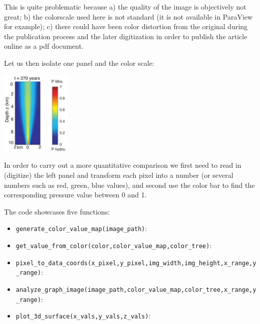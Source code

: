 This is quite problematic because a) the quality of the image is objectively not great; 
b) the colorscale used here is not standard (it is not available in ParaView for example); 
c) there could have been color distortion from the original during the publication 
process and the later digitization in order to publish the article online as a pdf document.

Let us then isolate one panel and the color scale:

\begin{center}
\includegraphics[height=4cm]{python_codes/fieldstone_170/images/graph_3_full}
\includegraphics[height=4cm]{python_codes/fieldstone_170/images/legenda}
\end{center}

In order to carry out a more quantitative comparison
we first need to read in (digitize) the left panel and transform each pixel into 
a number (or several numbers such as red, green, blue values), and second use the 
color bar to find the corresponding pressure value between 0 and 1.

The code showcases five functions:

\begin{itemize}
\item \lstinline{generate_color_value_map(image_path)}:
\item \lstinline{get_value_from_color(color,color_value_map,color_tree)}:
\item \lstinline{pixel_to_data_coords(x_pixel,y_pixel,img_width,img_height,x_range,y_range)}:
\item \lstinline{analyze_graph_image(image_path,color_value_map,color_tree,x_range,y_range)}:
\item \lstinline{plot_3d_surface(x_vals,y_vals,z_vals)}:
\end{itemize}





